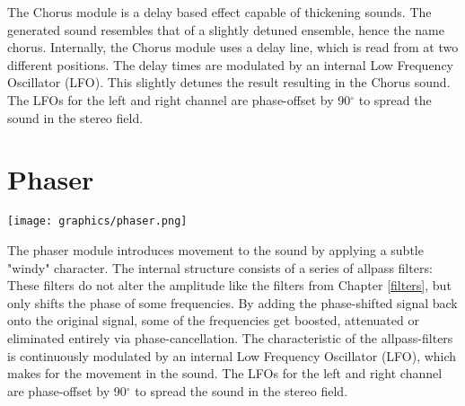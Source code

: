 The Chorus module is a delay based effect capable of thickening sounds. The generated sound resembles that of a slightly detuned ensemble, hence the name chorus. Internally, the Chorus module uses a delay line, which is read from at two different positions. The delay times are modulated by an internal Low Frequency Oscillator (LFO). This slightly detunes the result resulting in the Chorus sound. The LFOs for the left and right channel are phase-offset by 90$^{\circ}$ to spread the sound in the stereo field.






\section{Phaser}
\begin{center}
    \texttt{[image: graphics/phaser.png]}
\end{center}
The phaser module introduces movement to the sound by applying a subtle "windy" character. The internal structure consists of a series of allpass filters: These filters do not alter the amplitude like the filters from Chapter \ref{filters}, but only shifts the phase of some frequencies. By adding the phase-shifted signal back onto the original signal, some of the frequencies get boosted, attenuated or eliminated entirely via phase-cancellation. The characteristic of the allpass-filters is continuously modulated by an internal Low Frequency Oscillator (LFO), which makes for the movement in the sound. The LFOs for the left and right channel are phase-offset by 90$^{\circ}$ to spread the sound in the stereo field.

